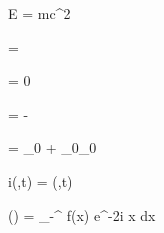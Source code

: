 
E = mc^2

\nabla \cdot {} = 

\nabla \cdot {} = 0

\nabla \times {} = -

\nabla \times {} = \mu_0 + \mu_0\epsilon_0

i\hbar{}\Psi(,t) = \Psi(,t)

(\xi) = \int_{-\infty}^{\infty} f(x) e^{-2\pi i x \xi} dx
